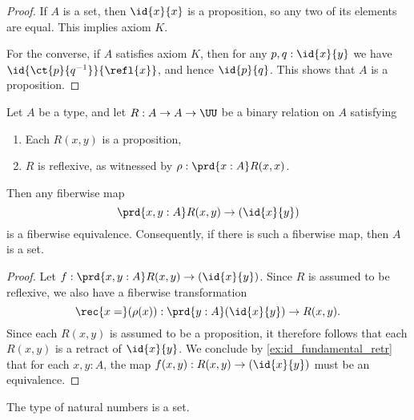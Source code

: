 \begin{proof}
If $A$ is a set, then $\id{x}{x}$ is a proposition, so any two of its elements are equal. 
This implies axiom $K$. 

For the converse, if $A$ satisfies axiom $K$, then for any $p,q:\id{x}{y}$ we have $\id{\ct{p}{q^{-1}}}{\refl{x}}$, and hence $\id{p}{q}$. This shows that $A$ is a proposition.
\end{proof}

\begin{lem}\label{lem:prop_to_id}
Let $A$ be a type, and let $R:A\to A\to\UU$ be a binary relation on $A$ satisfying
\begin{enumerate}
\item Each $R(x,y)$ is a proposition,
\item $R$ is reflexive, as witnessed by $\rho:\prd{x:A}R(x,x)$.
\end{enumerate}
Then any fiberwise map
\begin{equation*}
\prd{x,y:A}R(x,y)\to (\id{x}{y})
\end{equation*}
is a fiberwise equivalence. Consequently, if there is such a fiberwise map, then $A$ is a set.
\end{lem}

\begin{proof}
Let $f:\prd{x,y:A}R(x,y)\to(\id{x}{y})$. 
Since $R$ is assumed to be reflexive, we also have a fiberwise transformation
\begin{equation*}
\rec{x=}(\rho(x)):\prd{y:A}(\id{x}{y})\to R(x,y).
\end{equation*}
Since each $R(x,y)$ is assumed to be a proposition, it therefore follows that each $R(x,y)$ is a retract of $\id{x}{y}$. We conclude by \autoref{ex:id_fundamental_retr} that for each $x,y:A$, the map $f(x,y):R(x,y)\to(\id{x}{y})$ must be an equivalence. 
\end{proof}

\begin{thm}
The type of natural numbers is a set.
\end{thm}

